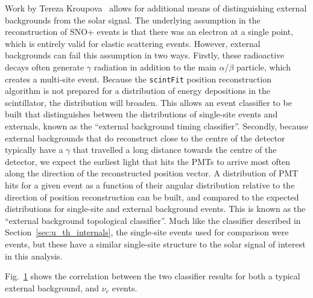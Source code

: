 Work by Tereza Kroupova~\cite{kroupovaImprovingSensitivityNeutrinoless2020} %
allows for additional means of distinguishing external backgrounds from the solar signal. The underlying assumption in the reconstruction of SNO+ events is that there was an electron at a single point, which is entirely valid for \beight{} elastic scattering events. However, external backgrounds can fail this assumption in two ways. Firstly, these radioactive decays often generate $\gamma$ radiation in addition to the main $\alpha$/$\beta$ particle, which creates a multi-site event. Because the \texttt{scintFit} position reconstruction algorithm is not prepared for a distribution of energy depositions in the scintillator, the \tres{} distribution will broaden. This allows an event classifier to be built that distinguishes between the \tres{} distributions of single-site events and externals, known as the ``external background timing classifier''. Secondly, because external backgrounds that do reconstruct close to the centre of the detector typically have a $\gamma$ that travelled a long distance towards the centre of the detector, we expect the earliest light that hits the PMTs to arrive most often along the direction of the reconstructed position vector. A distribution of PMT hits for a given event as a function of their angular distribution relative to the direction of position reconstruction can be built, and compared to the expected distributions for single-site and external background events. This is known as the ``external background topological classifier''. Much like the classifier described in Section~\ref{sec:u_th_internals}, the single-site events used for comparison were \onbb{} events, but these have a similar single-site structure to the solar signal of interest in this analysis.

Fig.~\ref{fig:external_classifier_corr} shows the correlation between the two classifier results for both a typical external background, and \beight{} $\nu_{e}$ events. %

\begin{figure}
    \centering
    \caption[]{}
    \label{fig:external_classifier_corr}
\end{figure}

